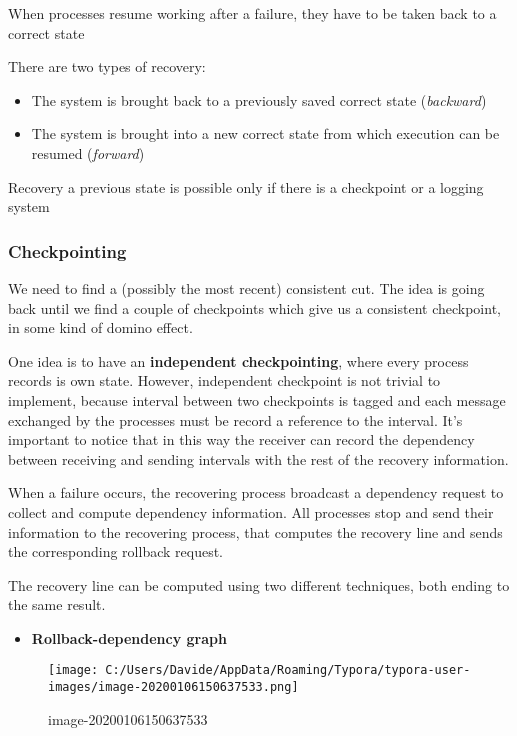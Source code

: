 When processes resume working after a failure, they have to be taken
back to a correct state

There are two types of recovery:

\begin{itemize}
\itemsep1pt\parskip0pt
\item
  The system is brought back to a previously saved correct state
  (\emph{backward})
\item
  The system is brought into a new correct state from which execution
  can be resumed (\emph{forward})
\end{itemize}

Recovery a previous state is possible only if there is a checkpoint or a
logging system

\subsubsection{Checkpointing}\label{checkpointing}

We need to find a (possibly the most recent) consistent cut. The idea is
going back until we find a couple of checkpoints which give us a
consistent checkpoint, in some kind of domino effect.

One idea is to have an \textbf{independent checkpointing}, where every
process records is own state. However, independent checkpoint is not
trivial to implement, because interval between two checkpoints is tagged
and each message exchanged by the processes must be record a reference
to the interval. It's important to notice that in this way the receiver
can record the dependency between receiving and sending intervals with
the rest of the recovery information.

When a failure occurs, the recovering process broadcast a dependency
request to collect and compute dependency information. All processes
stop and send their information to the recovering process, that computes
the recovery line and sends the corresponding rollback request.

The recovery line can be computed using two different techniques, both
ending to the same result.

\begin{itemize}
\itemsep1pt\parskip0pt
\item
  \textbf{Rollback-dependency graph}
\end{itemize}

\begin{figure}[htbp]
\centering
\texttt{[image: C:/Users/Davide/AppData/Roaming/Typora/typora-user-images/image-20200106150637533.png]}
\caption{image-20200106150637533}
\end{figure}

